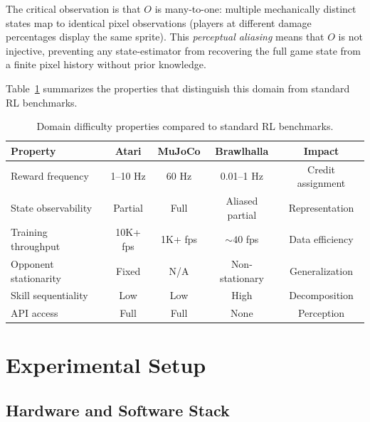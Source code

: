 \documentclass[11pt,a4paper]{article}
\begin{document}
The critical observation is that $O$ is many-to-one: multiple mechanically distinct states map to identical pixel observations (players at different damage percentages display the same sprite).
This \emph{perceptual aliasing} means that $O$ is not injective, preventing any state-estimator from recovering the full game state from a finite pixel history without prior knowledge.

Table~\ref{tab:domain-challenges} summarizes the properties that distinguish this domain from standard RL benchmarks.

\begin{table}[t]
\centering
\caption{Domain difficulty properties compared to standard RL benchmarks.}
\label{tab:domain-challenges}
\small
\begin{tabular}{@{}lcccc@{}}
\toprule
\textbf{Property} & \textbf{Atari} & \textbf{MuJoCo} & \textbf{Brawlhalla} & \textbf{Impact} \\
\midrule
Reward frequency & 1--10 Hz & 60 Hz & 0.01--1 Hz & Credit assignment \\
State observability & Partial & Full & Aliased partial & Representation \\
Training throughput & 10K+ fps & 1K+ fps & ${\sim}40$ fps & Data efficiency \\
Opponent stationarity & Fixed & N/A & Non-stationary & Generalization \\
Skill sequentiality & Low & Low & High & Decomposition \\
API access & Full & Full & None & Perception \\
\bottomrule
\end{tabular}
\end{table}

\section{Experimental Setup}
\label{sec:setup}

\subsection{Hardware and Software Stack}
\end{document}
